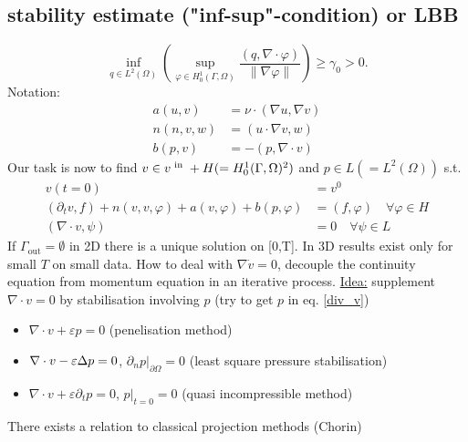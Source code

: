 \subsection{stability estimate ("inf-sup"-condition) or LBB}
\begin{equation*}
	\inf_{q \in L^2(\Omega)} \left(  \sup_{\varphi \in H^1_0(\Gamma,\Omega)} \frac{(q,\nabla \cdot \varphi )}{\|\nabla\varphi\|} \right) \geq \gamma_0 > 0.
\end{equation*}
Notation:
\begin{align*}
	a(u,v) &= \nu \cdot (\nabla u, \nabla v)\\
	n(n,v,w)&= (u \cdot \nabla v, w)\\
	b(p,v)&= -(p,\nabla\cdot v)
\end{align*}
Our task is now to find $v \in v^{\text{ in }} + H(=H^1_0(\Gamma,\Omega)^2)$ and $p \in L(=L^2(\Omega))$ s.t. 
\begin{align}
	v(t=0) &= v^0 \nonumber\\
	(\partial_tv,f) + n(v,v,\varphi) + a(v,\varphi) + b(p,\varphi) &= (f,\varphi)\quad \forall \varphi \in H\nonumber\\
	(\nabla \cdot v, \psi) &= 0 \quad \forall \psi \in L \label{div_v}
\end{align}
If $\Gamma_{\text{out}} = \emptyset $ in 2D there is a unique solution on [0,T]. In 3D results exist only for small $T$ on small data. How to deal with $\nabla\dot v= 0$, decouple the continuity equation from momentum equation in an iterative process.\nl
\underline{Idea:} supplement $\nabla \cdot v =0$ by stabilisation involving $p$ (try to get $p$ in eq. \eqref{div_v})
\begin{itemize}
	\item $\nabla \cdot v + \varepsilon p =0$ (penelisation method)
	\item $\nabla \cdot v - \varepsilon\Delta p =0$, $\partial_n p|_{\partial\Omega}=0$ (least square pressure stabilisation)
	\item $\nabla \cdot v + \varepsilon \partial_t p =0$, $p|_{t=0}=0$ (quasi incompressible method)
\end{itemize}
There exists a relation to classical projection methods (Chorin)
